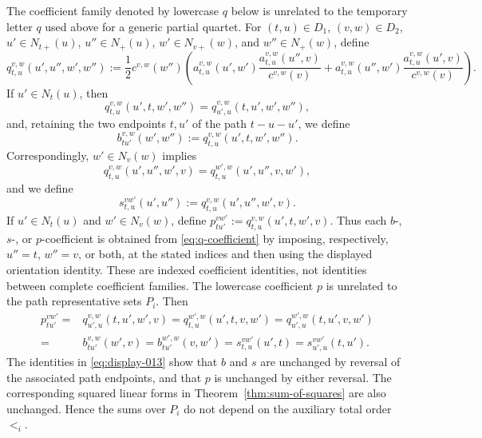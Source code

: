 \documentclass[12pt]{article}
\begin{document}
The coefficient family denoted by lowercase $q$ below is unrelated to the
temporary letter $q$ used above for a generic partial quartet.  For
$(t,u)\in D_1$, $(v,w)\in D_2$, $u'\in N_{t+}(u)$,
$u''\in N_+(u)$, $w'\in N_{v+}(w)$, and $w''\in N_+(w)$, define
\begingroup\small
\begin{equation}\label{eq:q-coefficient}
q_{t,u}^{v,w}(u',u'',w',w'')
:=\frac12c^{v,w}(w'')\left(
 a_{t,u}^{v,w}(u',w')\frac{a_{t,u}^{v,w}(u'',v)}{c^{v,w}(v)}
+
 a_{t,u}^{v,w}(u'',w')\frac{a_{t,u}^{v,w}(u',v)}{c^{v,w}(v)}
\right).
\end{equation}
\endgroup
If $u'\in N_t(u)$, then
\begin{equation}\label{eq:display-009}
q_{t,u}^{v,w}(u',t,w',w'')
=q_{u',u}^{v,w}(t,u',w',w''),
\end{equation}
and, retaining the two endpoints $t,u'$ of the path $t-u-u'$, we define
\begin{equation}\label{eq:b-coefficient}
b_{tu'}^{v,w}(w',w''):=q_{t,u}^{v,w}(u',t,w',w'').
\end{equation}
Correspondingly, $w'\in N_v(w)$ implies
\begin{equation}\label{eq:display-011}
q_{t,u}^{v,w}(u',u'',w',v)
=q_{t,u}^{w',w}(u',u'',v,w'),
\end{equation}
and we define
\begin{equation}\label{eq:s-coefficient}
s_{t,u}^{vw'}(u',u''):=q_{t,u}^{v,w}(u',u'',w',v).
\end{equation}
If $u'\in N_t(u)$ and $w'\in N_v(w)$, define
$p_{tu'}^{vw'}:=q_{t,u}^{v,w}(u',t,w',v)$.
Thus each $b$-, $s$-, or $p$-coefficient is obtained from
\eqref{eq:q-coefficient} by imposing, respectively, $u''=t$, $w''=v$, or
both, at the stated indices and then using the displayed orientation
identity.  These are indexed coefficient identities, not identities between
complete coefficient families.  The lowercase coefficient $p$ is unrelated
to the path representative sets $P_i$.
Then
\begin{equation}\label{eq:display-013}
\begin{aligned}
p_{tu'}^{vw'}
={}&q_{u',u}^{v,w}(t,u',w',v)
=q_{t,u}^{w',w}(u',t,v,w')
=q_{u',u}^{w',w}(t,u',v,w')\\
={}&b_{tu'}^{v,w}(w',v)
=b_{tu'}^{w',w}(v,w')
=s_{t,u}^{vw'}(u',t)
=s_{u',u}^{vw'}(t,u').
\end{aligned}
\end{equation}
The identities in \eqref{eq:display-013} show that $b$ and $s$ are unchanged by reversal of
the associated path endpoints, and that $p$ is unchanged by either reversal.
The corresponding squared linear forms in
Theorem~\ref{thm:sum-of-squares} are also unchanged.  Hence the sums over
$P_i$ do not depend on the auxiliary total order $<_i$.
\end{document}
